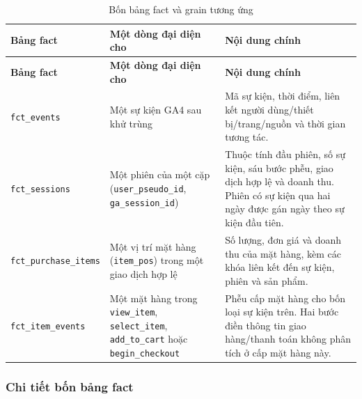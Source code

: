 \begin{xltabular}{\textwidth}{>{\raggedright\arraybackslash}p{3.5cm} >{\raggedright\arraybackslash}p{4.4cm} >{\raggedright\arraybackslash}X}
\caption{Bốn bảng fact và grain tương ứng}
\label{tab:fact-grain} \\
\hline
\textbf{Bảng fact} & \textbf{Một dòng đại diện cho} & \textbf{Nội dung chính} \\
\hline
\endfirsthead
\hline
\textbf{Bảng fact} & \textbf{Một dòng đại diện cho} & \textbf{Nội dung chính} \\
\hline
\endhead
\hline
\endfoot
\hline
\endlastfoot

\texttt{fct\_events}
& Một sự kiện GA4 sau khử trùng
& Mã sự kiện, thời điểm, liên kết người dùng/thiết bị/trang/nguồn và thời gian tương tác. \\

\texttt{fct\_sessions}
& Một phiên của một cặp (\texttt{user\_pseudo\_id}, \texttt{ga\_session\_id})
& Thuộc tính đầu phiên, số sự kiện, sáu bước phễu, giao dịch hợp lệ và doanh thu. Phiên có sự kiện qua hai ngày được gán ngày theo sự kiện đầu tiên. \\

\texttt{fct\_purchase\_items}
& Một vị trí mặt hàng (\texttt{item\_pos}) trong một giao dịch hợp lệ
& Số lượng, đơn giá và doanh thu của mặt hàng, kèm các khóa liên kết đến sự kiện, phiên và sản phẩm. \\

\texttt{fct\_item\_events}
& Một mặt hàng trong \texttt{view\_item}, \texttt{select\_item}, \texttt{add\_to\_cart} hoặc \texttt{begin\_checkout}
& Phễu cấp mặt hàng cho bốn loại sự kiện trên. Hai bước điền thông tin giao hàng/thanh toán không phân tích ở cấp mặt hàng này. \\
\end{xltabular}

\subsubsection{Chi tiết bốn bảng fact}

